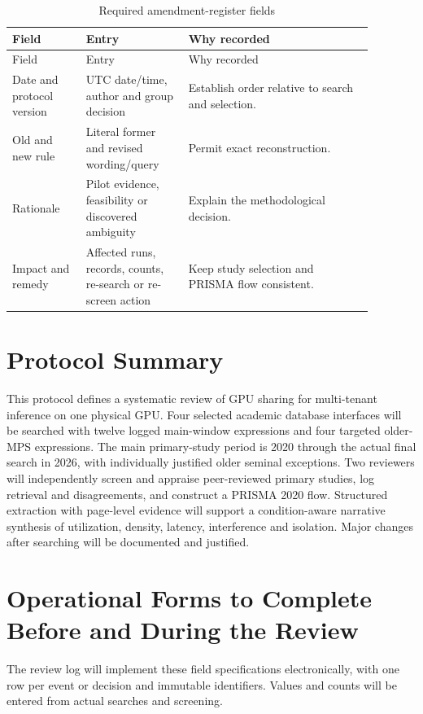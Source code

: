 \documentclass[12pt,a4paper]{article}
\begin{document}
\begin{longtable}{p{0.18\linewidth}p{0.25\linewidth}p{0.45\linewidth}}
\caption{Required amendment-register fields}\label{tab:amend}\\\toprule Field & Entry & Why recorded\\\midrule\endfirsthead
\toprule Field & Entry & Why recorded\\\midrule\endhead
Date and protocol version & UTC date/time, author and group decision & Establish order relative to search and selection.\\
Old and new rule & Literal former and revised wording/query & Permit exact reconstruction.\\
Rationale & Pilot evidence, feasibility or discovered ambiguity & Explain the methodological decision.\\
Impact and remedy & Affected runs, records, counts, re-search or re-screen action & Keep study selection and PRISMA flow consistent.\\\bottomrule
\end{longtable}

\section{Protocol Summary}
This protocol defines a systematic review of GPU sharing for multi-tenant inference on one physical GPU. Four selected academic database interfaces will be searched with twelve logged main-window expressions and four targeted older-MPS expressions. The main primary-study period is 2020 through the actual final search in 2026, with individually justified older seminal exceptions. Two reviewers will independently screen and appraise peer-reviewed primary studies, log retrieval and disagreements, and construct a PRISMA 2020 flow. Structured extraction with page-level evidence will support a condition-aware narrative synthesis of utilization, density, latency, interference and isolation. Major changes after searching will be documented and justified.

\appendix
\section{Operational Forms to Complete Before and During the Review}
The review log will implement these field specifications electronically, with one row per event or decision and immutable identifiers. Values and counts will be entered from actual searches and screening.
\end{document}
